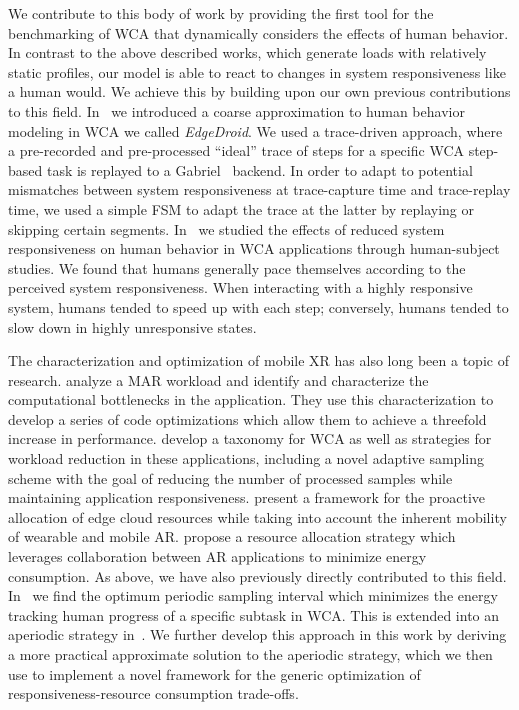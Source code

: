 We contribute to this body of work by providing the first tool for the benchmarking of \gls{WCA} that dynamically considers the effects of human behavior.
In contrast to the above described works, which generate loads with relatively static profiles, our model is able to react to changes in system responsiveness like a human would.
We achieve this by building upon our own previous contributions to this field.
In~\cite{olguinmunoz2018demoscaling,olguinmunoz2019edgedroid} we introduced a coarse approximation to human behavior modeling in \gls{WCA} we called \emph{EdgeDroid}.
We used a trace-driven approach, where a pre-recorded and pre-processed ``ideal'' trace of steps for a specific \gls{WCA} step-based task is replayed to a Gabriel~\cite{chen2018application} backend.
In order to adapt to potential mismatches between system responsiveness at trace-capture time and trace-replay time, we used a simple \gls{FSM} to adapt the trace at the latter by replaying or skipping certain segments.
In~\cite{olguinmunoz2021impact} we studied the effects of reduced system responsiveness on human behavior in \gls{WCA} applications through human-subject studies.
We found that humans generally pace themselves according to the perceived system responsiveness.
When interacting with a highly responsive system, humans tended to speed up with each step; conversely, humans tended to slow down in highly unresponsive states.

The characterization and optimization of mobile \gls{XR} has also long been a topic of research.
\textcite{srinivasan2009performance} analyze a \gls{MAR} workload and identify and characterize the computational bottlenecks in the application.
They use this characterization to develop a series of code optimizations which allow them to achieve a threefold increase in performance.
\textcite{wang2019towards} develop a taxonomy for \gls{WCA} as well as strategies for workload reduction in these applications, including a novel adaptive sampling scheme with the goal of reducing the number of processed samples while maintaining application responsiveness.
\textcite{huang2021proactive} present a framework for the proactive allocation of edge cloud resources while taking into account the inherent mobility of wearable and mobile \gls{AR}.
\textcite{al_shuwaili2017energy} propose a resource allocation strategy which leverages collaboration between \gls{AR} applications to minimize energy consumption.
As above, we have also previously directly contributed to this field.
In~\cite{moothedath2021energy,moothedath2022energy1} we find the optimum periodic sampling interval which minimizes the energy tracking human progress of a specific subtask in \gls{WCA}.
This is extended into an aperiodic strategy in~\cite{moothedath2022energy2}.
We further develop this approach in this work by deriving a more practical approximate solution to the aperiodic strategy, which we then use to implement a novel framework for the generic optimization of responsiveness-resource consumption trade-offs.
